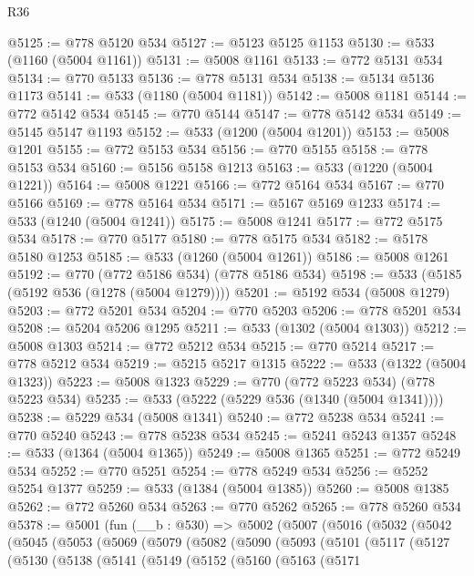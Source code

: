 \begin{lexlean}{R36}
\begin{coremodule}
@5125 := @778 @5120 @534
@5127 := @5123 @5125 @1153
@5130 := @533 (@1160 (@5004 @1161))
@5131 := @5008 @1161
@5133 := @772 @5131 @534
@5134 := @770 @5133
@5136 := @778 @5131 @534
@5138 := @5134 @5136 @1173
@5141 := @533 (@1180 (@5004 @1181))
@5142 := @5008 @1181
@5144 := @772 @5142 @534
@5145 := @770 @5144
@5147 := @778 @5142 @534
@5149 := @5145 @5147 @1193
@5152 := @533 (@1200 (@5004 @1201))
@5153 := @5008 @1201
@5155 := @772 @5153 @534
@5156 := @770 @5155
@5158 := @778 @5153 @534
@5160 := @5156 @5158 @1213
@5163 := @533 (@1220 (@5004 @1221))
@5164 := @5008 @1221
@5166 := @772 @5164 @534
@5167 := @770 @5166
@5169 := @778 @5164 @534
@5171 := @5167 @5169 @1233
@5174 := @533 (@1240 (@5004 @1241))
@5175 := @5008 @1241
@5177 := @772 @5175 @534
@5178 := @770 @5177
@5180 := @778 @5175 @534
@5182 := @5178 @5180 @1253
@5185 := @533 (@1260 (@5004 @1261))
@5186 := @5008 @1261
@5192 := @770 (@772 @5186 @534) (@778 @5186 @534)
@5198 := @533 (@5185 (@5192 @536 (@1278 (@5004 @1279))))
@5201 := @5192 @534 (@5008 @1279)
@5203 := @772 @5201 @534
@5204 := @770 @5203
@5206 := @778 @5201 @534
@5208 := @5204 @5206 @1295
@5211 := @533 (@1302 (@5004 @1303))
@5212 := @5008 @1303
@5214 := @772 @5212 @534
@5215 := @770 @5214
@5217 := @778 @5212 @534
@5219 := @5215 @5217 @1315
@5222 := @533 (@1322 (@5004 @1323))
@5223 := @5008 @1323
@5229 := @770 (@772 @5223 @534) (@778 @5223 @534)
@5235 := @533 (@5222 (@5229 @536 (@1340 (@5004 @1341))))
@5238 := @5229 @534 (@5008 @1341)
@5240 := @772 @5238 @534
@5241 := @770 @5240
@5243 := @778 @5238 @534
@5245 := @5241 @5243 @1357
@5248 := @533 (@1364 (@5004 @1365))
@5249 := @5008 @1365
@5251 := @772 @5249 @534
@5252 := @770 @5251
@5254 := @778 @5249 @534
@5256 := @5252 @5254 @1377
@5259 := @533 (@1384 (@5004 @1385))
@5260 := @5008 @1385
@5262 := @772 @5260 @534
@5263 := @770 @5262
@5265 := @778 @5260 @534
@5378 := @5001
    (fun (__b : @530) =>
    @5002
      (@5007
        (@5016
          (@5032
            (@5042
              (@5045
                (@5053
                  (@5069
                    (@5079
                      (@5082
                        (@5090
                          (@5093
                            (@5101
                              (@5117
                                (@5127
                                  (@5130
                                    (@5138
                                      (@5141
                                        (@5149
                                          (@5152
                                            (@5160
                                              (@5163
                                                (@5171

\end{coremodule}
\end{lexlean}
